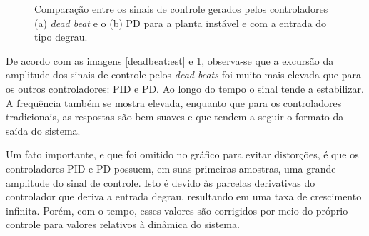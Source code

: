 \begin{figure}[H]
\begin{center}
\end{center}
\caption{Comparação entre os sinais de controle gerados pelos controladores (a) \textit{dead beat} e o (b) PD para a planta instável e com a entrada do tipo degrau.}
\label{deadbeat:ins} 
\end{figure}

De acordo com as imagens \ref{deadbeat:est} e \ref{deadbeat:ins}, observa-se que a excursão da amplitude dos sinais de controle pelos \textit{dead beats} foi muito mais elevada que para os outros controladores: PID e PD. Ao longo do tempo o sinal tende a estabilizar. A frequência também se mostra elevada, enquanto que para os controladores tradicionais, as respostas são bem suaves e que tendem a seguir o formato da saída do sistema. 

Um fato importante, e que foi omitido no gráfico para evitar distorções, é que os controladores PID e PD possuem, em suas primeiras amostras, uma grande amplitude do sinal de controle. Isto é devido às parcelas derivativas do controlador que deriva a entrada degrau, resultando em uma taxa de crescimento infinita. Porém, com o tempo, esses valores são corrigidos por meio do próprio controle para valores relativos à dinâmica do sistema.



\pagebreak